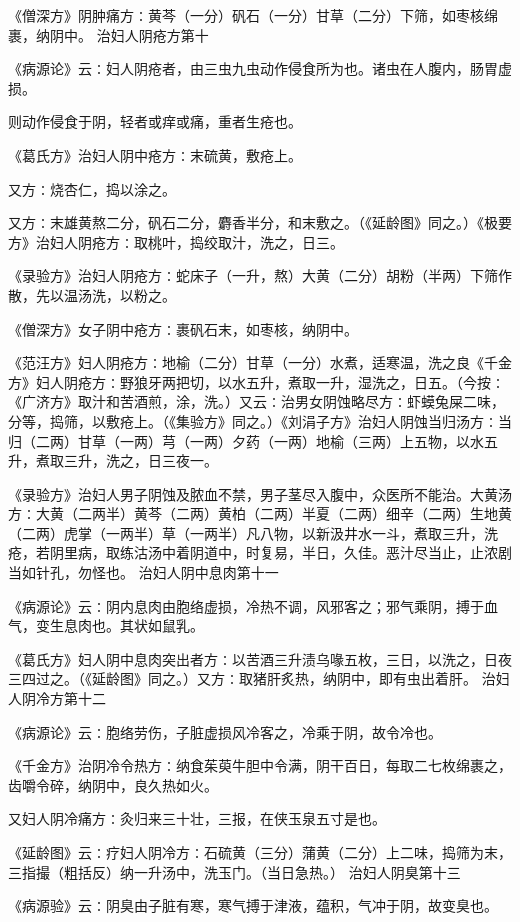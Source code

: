 \documentclass[a4paper,12pt,UTF8,twoside]{ctexbook}
\begin{document}
《僧深方》阴肿痛方∶黄芩（一分）矾石（一分）甘草（二分）下筛，如枣核绵裹，纳阴中。
治妇人阴疮方第十

《病源论》云∶妇人阴疮者，由三虫九虫动作侵食所为也。诸虫在人腹内，肠胃虚损。

则动作侵食于阴，轻者或痒或痛，重者生疮也。

《葛氏方》治妇人阴中疮方∶末硫黄，敷疮上。

又方∶烧杏仁，捣以涂之。

又方∶末雄黄熬二分，矾石二分，麝香半分，和末敷之。（《延龄图》同之。）《极要方》治妇人阴疮方∶取桃叶，捣绞取汁，洗之，日三。

《录验方》治妇人阴疮方∶蛇床子（一升，熬）大黄（二分）胡粉（半两）下筛作散，先以温汤洗，以粉之。

《僧深方》女子阴中疮方∶裹矾石末，如枣核，纳阴中。

《范汪方》妇人阴疮方∶地榆（二分）甘草（一分）水煮，适寒温，洗之良《千金方》妇人阴疮方∶野狼牙两把切，以水五升，煮取一升，湿洗之，日五。（今按∶《广济方》取汁和苦酒煎，涂，洗。）又云∶治男女阴蚀略尽方∶虾蟆兔屎二味，分等，捣筛，以敷疮上。（《集验方》同之。）《刘涓子方》治妇人阴蚀当归汤方∶当归（二两）甘草（一两）芎（一两）夕药（一两）地榆（三两）上五物，以水五升，煮取三升，洗之，日三夜一。

《录验方》治妇人男子阴蚀及脓血不禁，男子茎尽入腹中，众医所不能治。大黄汤方∶大黄（二两半）黄芩（二两）黄柏（二两）半夏（二两）细辛（二两）生地黄（二两）虎掌（一两半）草（一两半）凡八物，以新汲井水一斗，煮取三升，洗疮，若阴里病，取练沽汤中着阴道中，时复易，半日，久佳。恶汁尽当止，止浓剧当如针孔，勿怪也。
治妇人阴中息肉第十一

《病源论》云∶阴内息肉由胞络虚损，冷热不调，风邪客之；邪气乘阴，搏于血气，变生息肉也。其状如鼠乳。

《葛氏方》妇人阴中息肉突出者方∶以苦酒三升渍乌喙五枚，三日，以洗之，日夜三四过之。（《延龄图》同之。）又方∶取猪肝炙热，纳阴中，即有虫出着肝。
治妇人阴冷方第十二

《病源论》云∶胞络劳伤，子脏虚损风冷客之，冷乘于阴，故令冷也。

《千金方》治阴冷令热方∶纳食茱萸牛胆中令满，阴干百日，每取二七枚绵裹之，齿嚼令碎，纳阴中，良久热如火。

又妇人阴冷痛方∶灸归来三十壮，三报，在侠玉泉五寸是也。

《延龄图》云∶疗妇人阴冷方∶石硫黄（三分）蒲黄（二分）上二味，捣筛为末，三指撮（粗括反）纳一升汤中，洗玉门。（当日急热。）
治妇人阴臭第十三

《病源验》云∶阴臭由子脏有寒，寒气搏于津液，蕴积，气冲于阴，故变臭也。
\end{document}
